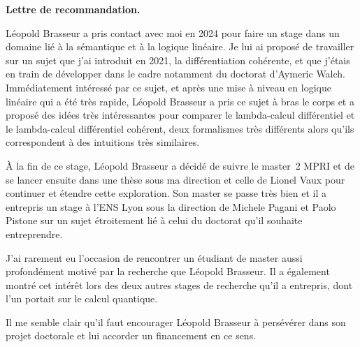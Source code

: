 \documentclass[12pt,pdftex]{letter}
\begin{document}
 \address{\vspace*{2cm}\\
 }

\signature{
\vspace{-2cm}
\texttt{[image: s4.jpg]}\\
Thomas Ehrhard\\ 
Directeur de recherche au CNRS\\
IRIF, UMR 8243
}

\begin{letter}{}

\newcommand\Name{Léopold Brasseur}
\newcommand\Fname{Brasseur}
\newcommand\Pname{Léopold}


\opening{\textbf{Lettre de recommandation.}}

\Name{} a pris contact avec moi en 2024 pour faire un stage dans un
domaine lié à la sémantique et à la logique linéaire.
%
Je lui ai proposé de travailler sur un sujet que j'ai introduit en
2021, la différentiation cohérente, et que j'étais en train de développer
dans le cadre notamment du doctorat d'Aymeric Walch.
%
Immédiatement intéressé par ce sujet, et après une mise à niveau en
logique linéaire qui a été très rapide, \Name{} a pris ce sujet à bras
le corps et a proposé des idées très intéressantes pour comparer le
lambda-calcul différentiel et le lambda-calcul différentiel cohérent,
deux formalismes très différents alors qu'ils correspondent à des
intuitions très similaires.

À la fin de ce stage, \Name{} a décidé de suivre le master~2 MPRI et
de se lancer ensuite dans une thèse sous ma direction et celle de
Lionel Vaux pour continuer et étendre cette exploration.
%
Son master se passe très bien et il a entrepris un stage à l'ENS Lyon
sous la direction de Michele Pagani et Paolo Pistone sur un sujet
étroitement lié à celui du doctorat qu'il souhaite entreprendre.

J'ai rarement eu l'occasion de rencontrer un étudiant de master aussi
profondément motivé par la recherche que \Name{}.
%
Il a également montré cet intérêt lors des deux autres stages de
recherche qu'il a entrepris, dont l'un portait sur le calcul
quantique.
%


Il me semble clair qu'il faut encourager \Name{} à
persévérer dans son projet doctorale et lui accorder un financement en
ce sens.



  \closing{\ }

\end{letter}
\end{document}

